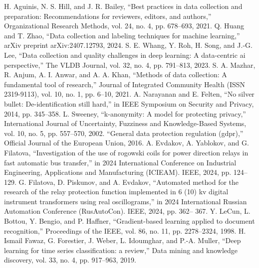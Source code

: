H. Aguinis, N. S. Hill, and J. R. Bailey, “Best practices in data collection and
preparation: Recommendations for reviewers, editors, and authors,” Organizational Research
Methods, vol. 24, no. 4, pp. 678–693, 2021.
Q. Huang and T. Zhao, “Data collection and labeling techniques for machine learning,”
arXiv preprint arXiv:2407.12793, 2024.
S. E. Whang, Y. Roh, H. Song, and J.-G. Lee, “Data collection and quality challenges in
deep learning: A data-centric ai perspective,” The VLDB Journal, vol. 32, no. 4, pp.
791–813, 2023.
S. A. Mazhar, R. Anjum, A. I. Anwar, and A. A. Khan, “Methods of data collection: A
fundamental tool of research,” Journal of Integrated Community Health (ISSN 2319-9113),
vol. 10, no. 1, pp. 6–10, 2021.
A. Narayanan and E. Felten, “No silver bullet: De-identification still hard,” in IEEE
Symposium on Security and Privacy, 2014, pp. 345–358.
L. Sweeney, “k-anonymity: A model for protecting privacy,” International Journal of
Uncertainty, Fuzziness and Knowledge-Based Systems, vol. 10, no. 5, pp. 557–570, 2002.
“General data protection regulation (gdpr),” Official Journal of the European Union, 2016.
A. Evdakov, A. Yablokov, and G. Filatova, “Investigation of the use of rogowski coils for
power direction relays in fast automatic bus transfer,” in 2024 International Conference
on Industrial Engineering, Applications and Manufacturing (ICIEAM). IEEE, 2024, pp.
124–129.
G. Filatova, D. Piskunov, and A. Evdakov, “Automated method for the research of the relay
protection function implemented in 6 (10) kv digital instrument transformers using real
oscillograms,” in 2024 International Russian Automation Conference (RusAutoCon). IEEE,
2024, pp. 362– 367.
Y. LeCun, L. Bottou, Y. Bengio, and P. Haffner, “Gradient-based learning applied to
document recognition,” Proceedings of the IEEE, vol. 86, no. 11, pp. 2278–2324, 1998.
H. Ismail Fawaz, G. Forestier, J. Weber, L. Idoumghar, and P.-A. Muller, “Deep learning
for time series classification: a review,” Data mining and knowledge discovery, vol. 33,
no. 4, pp. 917–963, 2019.
